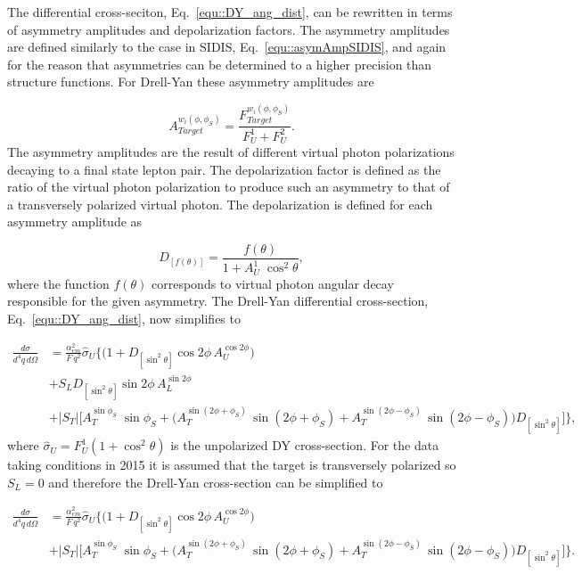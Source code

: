 The differential cross-seciton, Eq.~\ref{equ::DY_ang_dist}, can be rewritten in
terms of asymmetry amplitudes and depolarization factors.  The asymmetry
amplitudes are defined similarly to the case in SIDIS,
Eq.~\ref{equ::asymAmpSIDIS}, and again for the reason that asymmetries can be
determined to a higher precision than structure functions.  For Drell-Yan these
asymmetry amplitudes are

\begin{equation}
  A^{w_i(\phi, \phi_S)}_{Target} = \frac{F^{w_i(\phi,
      \phi_S)}_{Target}}{F_{U}^1+F_{U}^2}.
  \label{equ::asymAmpDY}
\end{equation}
\noindent
The asymmetry amplitudes are the result of different virtual photon
polarizations decaying to a final state lepton pair.  The depolarization factor
is defined as the ratio of the virtual photon polarization to produce such an
asymmetry to that of a transversely polarized virtual photon.  The
depolarization is defined for each asymmetry amplitude as

\begin{equation}
  D_{[f(\theta)]} = \frac{f(\theta)}{1+A_U^1\;\cos^2\theta},
\end{equation}
\noindent
where the function $f(\theta)$ corresponds to virtual photon angular decay
responsible for the given asymmetry.  The Drell-Yan differential cross-section,
Eq.~\ref{equ::DY_ang_dist}, now simplifies to~\cite{AKotzininaNote}

\begin{align}
  \label{equ::DY_usefulXsect}
  \frac{d\sigma}{d^4 q \, d \Omega} &=
  \frac{\alpha_{em}^2}{F \, q^2}\hat{\sigma}_U
  \Big \{ \Big(1 + D_{[\sin^2 \theta]} \cos 2\phi \, A_{U}^{\cos 2\phi} \Big)
 \nonumber \\
 &+ S_{L} D_{[\sin^2 \theta]} \sin 2\phi \, A_{L}^{\sin 2\phi}
   \nonumber \\
   &+ |S_{T}|
   \Big[A_{T}^{\sin \phi_S}\;\sin \phi_{S} 
     + \Big( A_{T}^{\sin (2\phi +\phi_S)}\, \sin(2\phi+\phi_S) +
     A_{T}^{\sin (2\phi - \phi_S)}\, \sin(2\phi-\phi_S) \Big)D_{[\sin ^2\theta]}
     \Big ]
   \Big \},
\end{align}
\noindent
where $\hat{\sigma}_U = F^1_U (1+\cos^2\theta)$ is the unpolarized DY
cross-section.  For the data taking conditions in 2015 it is assumed that the target is transversely polarized so $S_L = 0$ and therefore the Drell-Yan cross-section can be simplified to

\begin{align}
  \label{equ::DY_MostusefulXsect}
  \frac{d\sigma}{d^4 q \, d \Omega} &=
  \frac{\alpha_{em}^2}{F \, q^2}\hat{\sigma}_U
  \Big \{ \Big(1 + D_{[\sin^2 \theta]} \cos 2\phi \, A_{U}^{\cos 2\phi} \Big)
   \nonumber \\
   &+ |S_{T}|
   \Big[A_{T}^{\sin \phi_S}\;\sin \phi_{S} 
     + \Big( A_{T}^{\sin (2\phi +\phi_S)}\, \sin(2\phi+\phi_S) +
     A_{T}^{\sin (2\phi - \phi_S)}\, \sin(2\phi-\phi_S) \Big)D_{[\sin ^2\theta]}
     \Big ]
   \Big \}.
\end{align}

